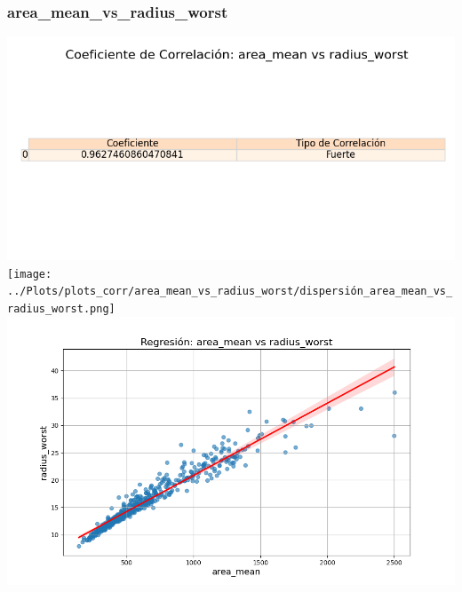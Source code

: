 \documentclass[a4paper, 12pt]{article}
\begin{document}
\subsubsection{area\_mean\_vs\_radius\_worst}
	\includegraphics[width = \textwidth]{../Plots/plots_corr/area_mean_vs_radius_worst/coeficiente_correlacion_area_mean_vs_radius_worst.png}
	\texttt{[image: ../Plots/plots\_corr/area\_mean\_vs\_radius\_worst/dispersión\_area\_mean\_vs\_radius\_worst.png]}
	\includegraphics[width = \textwidth]{../Plots/plots_corr/area_mean_vs_radius_worst/regresion_area_mean_vs_radius_worst.png}
\end{document}
